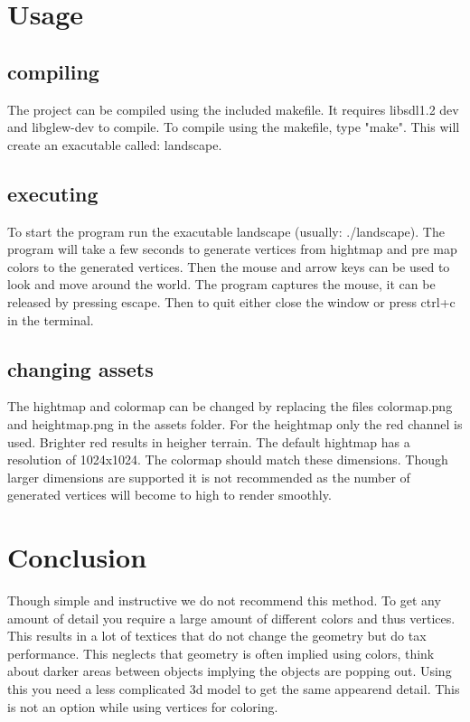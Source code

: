 \documentclass[a4paper, 11pt]{article} %
\begin{document}


\section*{Usage}

\subsection*{compiling}
The project can be compiled using the included makefile. It requires libsdl1.2 dev and libglew-dev to compile. To compile using the makefile, type "make". This will create an exacutable called: landscape.

\subsection*{executing}
To start the program run the exacutable landscape (usually: ./landscape). The program will take a few seconds to generate vertices from hightmap and pre map colors to the generated vertices. Then the mouse and arrow keys can be used to look and move around the world. The program captures the mouse, it can be released by pressing escape. Then to quit either close the window or press ctrl+c in the terminal.

\subsection*{changing assets}
The hightmap and colormap can be changed by replacing the files colormap.png and heightmap.png in the assets folder. For the heightmap only the red channel is used. Brighter red results in heigher terrain. The default hightmap has a resolution of 1024x1024. The colormap should match these dimensions. Though larger dimensions are supported it is not recommended as the number of generated vertices will become to high to render smoothly.

\section*{Conclusion}

Though simple and instructive we do not recommend this method. To get any amount of detail you require a large amount of different colors and thus vertices. This results in a lot of textices that do not change the geometry but do tax performance. This neglects that geometry is often implied using colors, think about darker areas between objects implying the objects are popping out. Using this you need a less complicated 3d model to get the same appearend detail. This is not an option while using vertices for coloring.
\end{document}
